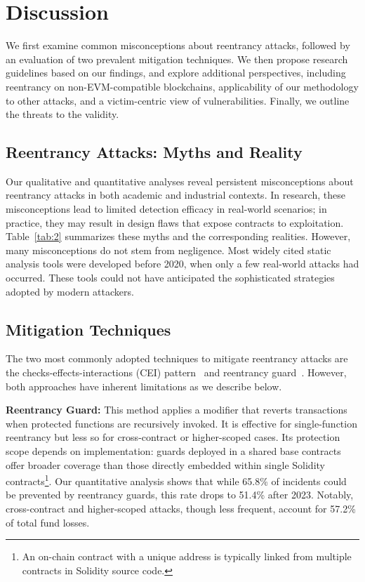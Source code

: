 

\section{Discussion}

We first examine common misconceptions about reentrancy attacks, followed by an evaluation of two prevalent mitigation techniques. We then propose research guidelines based on our findings, and explore additional perspectives, including reentrancy on non-EVM-compatible blockchains, applicability of our methodology to other attacks, and a victim-centric view of vulnerabilities. Finally, we outline the threats to the validity.


\subsection{Reentrancy Attacks: Myths and Reality}

Our qualitative and quantitative analyses reveal persistent misconceptions about reentrancy attacks in both academic and industrial contexts. In research, these misconceptions lead to limited detection efficacy in real-world scenarios; in practice, they may result in design flaws that expose contracts to exploitation. Table~\ref{tab:2} summarizes these myths and the corresponding realities.
%
However, many misconceptions do not stem from negligence. Most widely cited static analysis tools were developed before 2020, when only a few real-world attacks had occurred. These tools could not have anticipated the sophisticated strategies adopted by modern attackers.


\subsection{Mitigation Techniques}
\label{discussion:mitigation}

The two most commonly adopted techniques to mitigate reentrancy attacks are the checks-effects-interactions (CEI) pattern~\cite{checks-effects-interactions} and reentrancy guard~\cite{reentrancy-guard}. However, both approaches have inherent limitations as we describe below.

\textbf{Reentrancy Guard:} This method applies a modifier that reverts transactions when protected functions are recursively invoked. It is effective for single-function reentrancy but less so for cross-contract or higher-scoped cases. Its protection scope depends on implementation: guards deployed in a shared base contracts offer broader coverage than those directly embedded within single Solidity contracts\footnote{An on-chain contract with a unique address is typically linked from multiple contracts in Solidity source code.}. Our quantitative analysis shows that while 65.8\% of incidents could be prevented by reentrancy guards, this rate drops to 51.4\% after 2023. Notably, cross-contract and higher-scoped attacks, though less frequent, account for 57.2\% of total fund losses.

